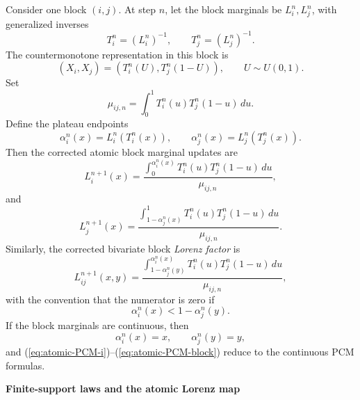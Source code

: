 \documentclass[onecolumn]{article}
\begin{document}
Consider one block $(i,j)$. At step $n$, let the block marginals be $%
L_{i}^{n},L_{j}^{n}$, with generalized inverses 
\begin{equation*}
T_{i}^{n}=(L_{i}^{n})^{-1},\qquad T_{j}^{n}=(L_{j}^{n})^{-1}.
\end{equation*}%
The countermonotone representation in this block is 
\begin{equation*}
(X_{i},X_{j})=(T_{i}^{n}(U),T_{j}^{n}(1-U)),\qquad U\sim U(0,1).
\end{equation*}%
Set 
\begin{equation*}
\mu _{ij,n}=\int_{0}^{1}T_{i}^{n}(u)T_{j}^{n}(1-u)\,du.
\end{equation*}%
Define the plateau endpoints 
\begin{equation*}
\alpha _{i}^{n}(x)=L_{i}^{n}(T_{i}^{n}(x)),\qquad \alpha
_{j}^{n}(x)=L_{j}^{n}(T_{j}^{n}(x)).
\end{equation*}%
Then the corrected atomic block marginal updates are 
\begin{equation}
L_{i}^{n+1}(x)=\frac{\int_{0}^{\alpha
_{i}^{n}(x)}T_{i}^{n}(u)T_{j}^{n}(1-u)\,du}{\mu _{ij,n}},
\label{eq:atomic-PCM-i}
\end{equation}%
and 
\begin{equation}
L_{j}^{n+1}(x)=\frac{\int_{1-\alpha
_{j}^{n}(x)}^{1}T_{i}^{n}(u)T_{j}^{n}(1-u)\,du}{\mu _{ij,n}}.
\label{eq:atomic-PCM-j}
\end{equation}%
Similarly, the corrected bivariate block \textit{Lorenz factor} is 
\begin{equation}
L_{ij}^{n+1}(x,y)=\frac{\int_{1-\alpha _{j}^{n}(y)}^{\alpha
_{i}^{n}(x)}T_{i}^{n}(u)T_{j}^{n}(1-u)\,du}{\mu _{ij,n}},
\label{eq:atomic-PCM-block}
\end{equation}%
with the convention that the numerator is zero if 
\begin{equation*}
\alpha _{i}^{n}(x)<1-\alpha _{j}^{n}(y).
\end{equation*}%
If the block marginals are continuous, then 
\begin{equation*}
\alpha _{i}^{n}(x)=x,\qquad \alpha _{j}^{n}(y)=y,
\end{equation*}%
and (\ref{eq:atomic-PCM-i})--(\ref{eq:atomic-PCM-block}) reduce to the
continuous PCM formulas.

\begin{flushleft}
\textbf{\bigskip Finite-support laws and the atomic Lorenz map}
\end{flushleft}
\end{document}
